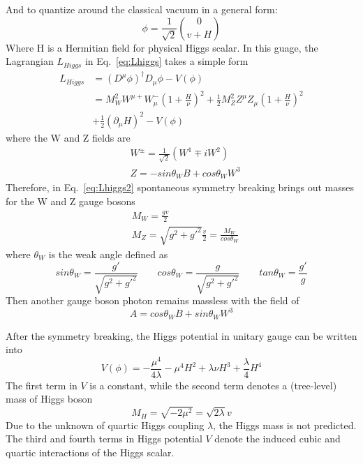 And to quantize around the classical vacuum in a general form:
\begin{equation}
	\phi = \frac{1}{\sqrt{2}} \binom{0}{v+H}
\end{equation}
Where H is a Hermitian field for physical Higgs scalar.
In this guage, the Lagrangian $L_{Higgs}$ in Eq.~\ref{eq:Lhiggs} takes a simple form
\begin{equation}
\begin{split} \label{eq:Lhiggs2}
	L_{Higgs} & = \left(D^{\mu}\phi\right)^{\dagger}D_{\mu}\phi - V(\phi) \\
	& = M_{W}^{2}W^{\mu+}W_{\mu}^{-}\left(1+\frac{H}{\nu}\right)^{2} + \frac{1}{2}M_{Z}^{2}Z^{\mu}Z_{\mu}\left(1+\frac{H}{\nu}\right)^{2} \\ 
        &   + \frac{1}{2}\left(\partial_{\mu}H\right)^{2} - V(\phi)
\end{split}
\end{equation}
where the W and Z fields are
\begin{equation}
\begin{split}
	& W^{\pm} = \frac{1}{\sqrt{2}} \left(W^{1} \mp iW^{2}\right) \\
	& Z = - sin\theta_{W}B + cos\theta_{W}W^{3}
\end{split}
\end{equation}
Therefore, in Eq.~\ref{eq:Lhiggs2} spontaneous symmetry breaking brings out masses for the W and Z gauge bosons
\begin{equation}
\begin{split}
	& M_{W} = \frac{gv}{2} \\
	& M_{Z} = \sqrt{g^{2} + g'^{2}} \frac{v}{2} = \frac{M_{W}}{cos\theta_{W}}
\end{split}
\end{equation}
where $\theta_{W}$ is the weak angle defined as
\begin{equation}
	sin\theta_{W} = \frac{g'}{\sqrt{g^{2} + g'^{2}}} \qquad cos\theta_{W} = \frac{g}{\sqrt{g^{2} + g'^{2}}} \qquad tan\theta_{W} = \frac{g'}{g}
\end{equation}
Then another gauge boson photon remains massless with the field of
\begin{equation}
	A = cos\theta_{W}B + sin\theta_{W}W^{3}
\end{equation}

After the symmetry breaking, the Higgs potential in unitary gauge can be written into
\begin{equation}
	V(\phi) = -\frac{\mu^{4}}{4\lambda} - \mu^{4}H^{2} + \lambda\nu H^{3} + \frac{\lambda}{4}H^{4}
\end{equation}
The first term in $V$ is a constant, while the second term denotes a (tree-level) mass of Higgs boson
\begin{equation}
	M_{H} = \sqrt{-2\mu^{2}} = \sqrt{2\lambda}v
\end{equation}
Due to the unknown of  quartic Higgs coupling $\lambda$, the Higgs mass is not predicted.
The third and fourth terms in Higgs potential $V$ denote the induced cubic and quartic interactions of the Higgs scalar.

